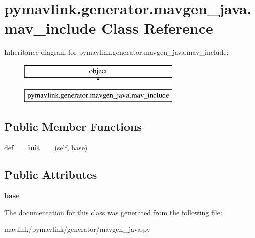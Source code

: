 \hypertarget{classpymavlink_1_1generator_1_1mavgen__java_1_1mav__include}{}\section{pymavlink.\+generator.\+mavgen\+\_\+java.\+mav\+\_\+include Class Reference}
\label{classpymavlink_1_1generator_1_1mavgen__java_1_1mav__include}
Inheritance diagram for pymavlink.\+generator.\+mavgen\+\_\+java.\+mav\+\_\+include\+:\begin{figure}[H]
\begin{center}
\leavevmode
\includegraphics[height=2.000000cm]{classpymavlink_1_1generator_1_1mavgen__java_1_1mav__include}
\end{center}
\end{figure}
\subsection*{Public Member Functions}
\begin{DoxyCompactItemize}
\item 
\mbox{\label{classpymavlink_1_1generator_1_1mavgen__java_1_1mav__include_a1bc1ed7cfef7a94f8ab9f9f8f5d7afad}} 
def {\bfseries \+\_\+\+\_\+init\+\_\+\+\_\+} (self, base)
\end{DoxyCompactItemize}
\subsection*{Public Attributes}
\begin{DoxyCompactItemize}
\item 
\mbox{\label{classpymavlink_1_1generator_1_1mavgen__java_1_1mav__include_a47b56477ee0fc60313b62235eabdd5e5}} 
{\bfseries base}
\end{DoxyCompactItemize}


The documentation for this class was generated from the following file\+:\begin{DoxyCompactItemize}
\item 
mavlink/pymavlink/generator/mavgen\+\_\+java.\+py\end{DoxyCompactItemize}
